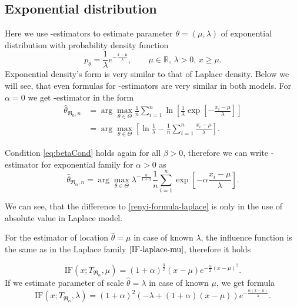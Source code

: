 \subsection{Exponential distribution} 
Here we use \mRa-estimators to estimate parameter $\theta = (\mu,\lambda)$ of exponential distribution with probability density function 
\begin{equation}
	p_\theta = \frac{1}{\lambda} e^{-\frac{x-\mu}{\lambda}}, \qquad \mu\in \mathbb{R},\, \lambda>0, \, x\geq\mu.
\end{equation}
\noindent Exponential density's form is very similar to that of Laplace density. Below we will see, that even formulas for \mRa-estimators are very similar in both models. For $\alpha = 0$ we get \mRa-estimator in the form
\begin{align}
	\hat{\theta}_{\mathfrak{R}_0,n} & =  \arg \max_{\theta \in \Theta} \frac{1}{n} \sum^n_{i=1} \ln \left[ \frac{1}{\lambda}\exp \left[-\frac{x_i-\mu}{\lambda} \right] \right] \nonumber \\
	& =  \arg \max_{\theta \in \Theta} \left[ \ln \frac{1}{\lambda} - \frac{1}{n} \sum^n_{i=1} \frac{x_i-\mu}{\lambda} \right].
\end{align}

\noindent Condition \ref{eq:betaCond} holds again for all  $\beta>0$, therefore we can write \mRa-estimator for exponential family for $\alpha>0$ as
\begin{equation}
	\hat{\theta}_{\mathfrak{R}_\alpha,n} = \arg \max_{\theta \in \Theta} \lambda^{-\frac{\alpha}{1+\alpha}} \frac{1}{n}\sum_{i=1}^n \exp \left[-\alpha\frac{x_i-\mu}{\lambda} \right].
	\label{renyi-formula-exponential}
\end{equation}

We can see, that the difference to \eqref{renyi-formula-laplace} is only in the use of absolute value in Laplace model.

For  the estimator of location $\hat{\theta} = \mu$ in case of known $\lambda$, the influence function is the same as in the Laplace family $\eqref{IF-laplace-mu}$, therefore it holds

\begin{equation}
	\mathrm{IF}(x;T_{\mathfrak{R}_\alpha},\mu) = (1+\alpha )^{\frac{3}{2}} (x-\mu )  e^{-\frac{\alpha}{2} (x-\mu )^2}. %
	\label{IF-exponential-mu}
\end{equation}
If we estimate parameter of scale $\hat{\theta} = \lambda$ in case of known $ \mu $, we get formula
\begin{equation}
	\mathrm{IF}(x;T_{\mathfrak{R}_\alpha},\lambda) =	(1+\alpha )^2 \left( - \lambda +(1+ \alpha)(x-\mu)\right) e^{-\frac{\alpha (x-\mu)}{\lambda }}. %
	\label{IF-exponential-lambda}
\end{equation}

